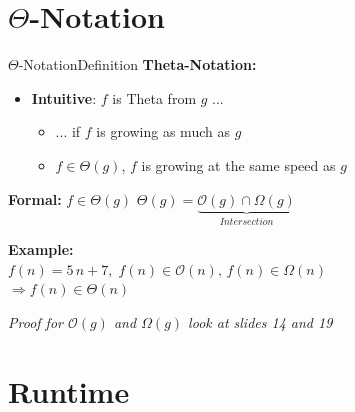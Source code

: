 
\section{\texorpdfstring{$\Theta$}{Theta}-Notation}

\begin{frame}{$\Theta$-Notation}{Definition}
  \textbf{Theta-Notation:}
  \begin{itemize}
    \item
      \textbf{Intuitive}: $f$ is Theta from $g$ ...\\
        \begin{itemize}
            \item
              ... if $f$ is growing as much as $g$
            \item
              $f \in \Theta(g)$, $f$ is growing at the same speed as $g$
       \end{itemize}
  \end{itemize}
 	\begin{block}{\textbf{Formal:} $f \in \Theta(g)$}
 		$\Theta(g) = \underbrace{\mathcal O(g) \cap \Omega(g)}_{Intersection}$
 	\end{block}
  \textbf{Example:}\\
  \hspace*{1.5em}$f(n) = 5 \, n + 7, \;
    f(n) \in \mathcal{O}(n), \,
    f(n) \in \Omega(n)$\\
  \hspace*{3.0em}$\Rightarrow f(n) \in \Theta(n)$\\[0.5em]
  \begin{center}
   \textit{Proof for $\mathcal{O}(g)$ and $\Omega(g)$ look at slides 14 and 19}
  \end{center}
\end{frame}


\section{Runtime}



